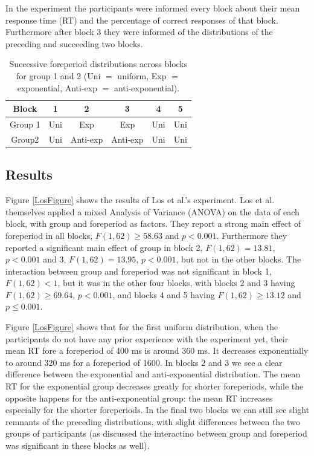 \documentclass[10pt,letterpaper]{article}
\begin{document}
In the experiment the participants were informed every block about their mean response time (RT) and the percentage of correct responses of that block. Furthermore after block 3 they were informed of the distributions of the preceding and succeeding two blocks.

\begin{table}
	\centering
	\caption{Successive foreperiod distributions across blocks for group 1 and 2 (Uni $=$ uniform, Exp $=$ exponential, Anti-exp $=$ anti-exponential).}
	\begin{tabular}{c|c|c|c|c|c}
		Block & 1 & 2 & 3 & 4 & 5 \\
		\hline
		Group 1 & Uni & Exp & Exp & Uni & Uni \\
		Group2 & Uni & Anti-exp & Anti-exp & Uni & Uni
	\end{tabular}
	\label{Table1}
\end{table}

\subsection{Results}
Figure \ref{LosFigure} shows the results of Los et al.'s experiment. Los et al. themselves applied a mixed Analysis of Variance (ANOVA) on the data of each block, with group and foreperiod as factors. They report a strong main effect of foreperiod in all blocks, $F (1, 62) \geq 58.63$ and $p < 0.001$. Furthermore they reported a significant main effect of group in block 2, $F (1, 62) = 13.81$, $p < 0.001$ and 3, $F(1, 62) = 13.95$, $p < 0.001$, but not in the other blocks. The interaction between group and foreperiod was not significant in block 1, $F(1, 62) < 1$, but it was in the other four blocks, with blocks 2 and 3 having $F (1, 62) \geq 69.64$, $p < 0.001$, and blocks 4 and 5 having $F (1, 62) \geq 13.12$ and $p \leq 0.001$.

Figure \ref{LosFigure} shows that for the first uniform distribution, when the participants do not have any prior experience with the experiment yet, their mean RT fore a foreperiod of 400 ms is around 360 ms. It decreases exponentially to around 320 ms for a foreperiod of 1600. In blocks 2 and 3 we see a clear difference between the exponential and anti-exponential distribution. The mean RT for the exponential group decreases greatly for shorter foreperiods, while the opposite happens for the anti-exponential group: the mean RT increases especially for the shorter foreperiods. In the final two blocks we can still see slight remnants of the preceding distributions, with slight differences between the two groups of participants (as discussed the interactino between group and foreperiod was significant in these blocks as well).
\end{document}
